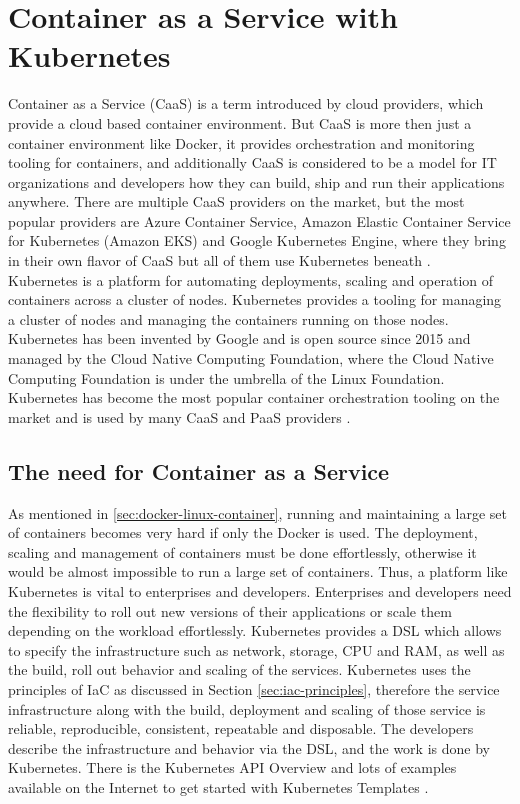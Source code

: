 \chapter{Container as a Service with Kubernetes}
\label{cha:caas}
Container as a Service (CaaS) is a term introduced by cloud providers, which provide a cloud based container environment. But CaaS is more then just a container environment like Docker, it provides orchestration and monitoring tooling for containers, and additionally CaaS is considered to be a model for IT organizations and developers how they can build, ship and run their applications anywhere. There are multiple CaaS providers on the market, but the most popular providers are Azure Container Service, Amazon Elastic Container Service for Kubernetes (Amazon EKS) and Google Kubernetes Engine, where they bring in their own flavor of CaaS but all of them use Kubernetes beneath  \cite{CNCFKubernetes2018, MicrosoftAzureAKS2018, AmazonWebServicesEKS2018, GoogleCloudKE2018}. \\

Kubernetes is a platform for automating deployments, scaling and operation of containers across a cluster of nodes. Kubernetes provides a tooling for managing a cluster of nodes and managing the containers running on those nodes. Kubernetes has been invented by Google and is open source since 2015 and managed by the Cloud Native Computing Foundation, where the Cloud Native Computing Foundation is under the umbrella of the Linux Foundation. Kubernetes has become the most popular container orchestration tooling on the market and is used by many CaaS and PaaS providers \cite{CNCF2018}.

\section{The need for Container as a Service}
\label{sec:caas-need-for-caas}
As mentioned in \vref{sec:docker-linux-container}, running and maintaining a large set of containers becomes very hard if only the Docker is used. The deployment, scaling and management of containers must be done effortlessly, otherwise it would be almost impossible to run a large set of containers. Thus, a platform like Kubernetes is vital to enterprises and developers. Enterprises and developers need the flexibility to roll out new versions of their applications or scale them depending on the workload effortlessly. Kubernetes provides a DSL which allows to specify the infrastructure such as network, storage, CPU and RAM, as well as the build, roll out behavior and scaling of the services. Kubernetes uses the principles of IaC as discussed in Section \vref{sec:iac-principles}, therefore the service infrastructure along with the build, deployment and scaling of those service is reliable, reproducible, consistent, repeatable and disposable. The developers describe the infrastructure and behavior via the DSL, and the work is done by Kubernetes. There is the Kubernetes API Overview and lots of examples available on the Internet to get started with Kubernetes Templates \cite{CNCFKubernetesAPI2018, CNCFKubernetesGithub2018}. \\

